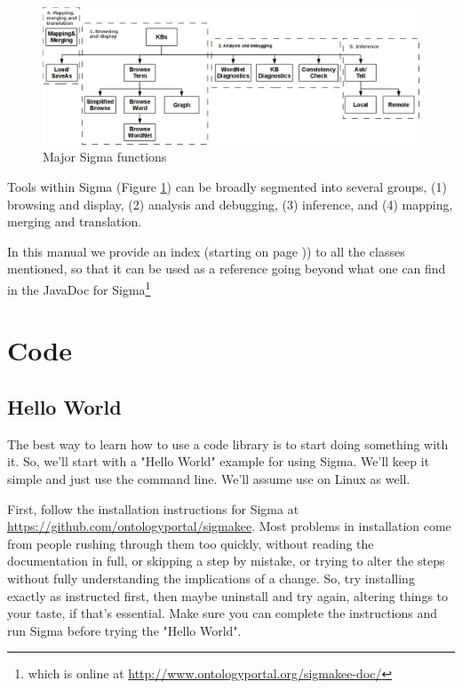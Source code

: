 \documentclass{book}
\begin{document}
\begin{figure}
  \centering
  \includegraphics[width=4.5in]{pictures/SigmaOver.png}
  \caption{Major Sigma functions}
  \label{fig:SigmaOver}
\end{figure}

Tools within Sigma (Figure \ref{fig:SigmaOver}) can be broadly segmented into
several groups, (1) browsing and display, (2) analysis and debugging, (3)
inference, and (4) mapping, merging and translation.  

In this manual we provide an index (starting on page \pageref{classindex})) to
all the classes mentioned, so that it can be used as a reference going beyond
what one can find in the JavaDoc for Sigma\footnote{which is online at
\url{http://www.ontologyportal.org/sigmakee-doc/}}

\chapter{Code}

\section{Hello World}

The best way to learn how to use a code library is to start doing something with it. So,
we'll start with a "Hello World" example for using Sigma.  We'll keep it simple and just 
use the command line.  We'll assume use on Linux as well.

First, follow the installation instructions for Sigma at
\url{https://github.com/ontologyportal/sigmakee}. Most problems in installation
come from people rushing through them too quickly, without reading the
documentation in full, or skipping a step by mistake, or trying to alter the
steps without fully understanding the implications of a change.  So, try
installing exactly as instructed first, then maybe uninstall and try again,
altering things to your taste, if that's essential.  Make sure you can complete the
instructions and run Sigma before trying the "Hello World".
\end{document}

